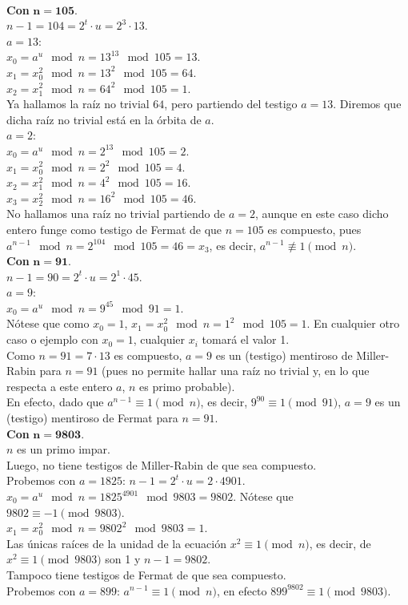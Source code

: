 \begin{ejemplo} \, \\
\textbf{Con} $\boldsymbol{n=105}$. \\
$n-1 = 104 = 2^t \cdot u = 2^3 \cdot 13$. \\
$a=13$: \\
$x_0 = a^{u} \mod n =13^{13} \mod 105 = 13$. \\
$x_1 = x_0^2 \mod n = 13^2 \mod 105 = 64$. \\
$x_2 = x_1^2 \mod n = 64^2 \mod 105 = 1$. \\
Ya hallamos la raíz no trivial $64$, pero partiendo del testigo $a=13$. Diremos que dicha raíz no trivial está en la órbita de $a$. \\
$a=2$: \\
$x_0 = a^{u} \mod n =2^{13} \mod 105 = 2$. \\
$x_1 = x_0^2 \mod n = 2^2 \mod 105 = 4$. \\
$x_2 = x_1^2 \mod n = 4^2 \mod 105 = 16$. \\
$x_3 = x_2^2 \mod n = 16^2 \mod 105 = 46$. \\
No hallamos una raíz no trivial partiendo de $a=2$, aunque en este caso dicho entero funge como testigo de Fermat de que $n=105$ es compuesto, pues $a^{n-1} \mod n = 2^{104} \mod 105 = 46 = x_3$, es decir, $a^{n-1} \not\equiv 1 \pmod n$. \\
\textbf{Con} $\boldsymbol{n=91}$. \\
$n-1 = 90 = 2^t \cdot u = 2^1 \cdot 45$. \\
$a=9$: \\
$x_0 = a^{u} \mod n =9^{45} \mod 91 = 1$. \\
Nótese que como $x_0=1$, $x_1 = x_0^2 \mod n = 1^2 \mod 105 = 1$. En cualquier otro caso o ejemplo con $x_0=1$, cualquier $x_i$ tomará el valor 1. \\
Como $n=91=7 \cdot 13$ es compuesto, $a=9$ es un (testigo) mentiroso de Miller-Rabin para $n=91$ (pues no permite hallar una raíz no trivial y, en lo que respecta a este entero $a$, $n$ es primo probable). \\
En efecto, dado que $a^{n-1} \equiv 1 \pmod n$, es decir, $9^{90} \equiv 1 \pmod {91}$, $a=9$ es un (testigo) mentiroso de Fermat para $n=91$.\\
\textbf{Con} $\boldsymbol{n=9803}$. \\
$n$ es un primo impar. \\
Luego, no tiene testigos de Miller-Rabin de que sea compuesto. \\ 
Probemos con $a=1825$:
$n-1 = 2^t \cdot u =2 \cdot 4901$. \\
$x_0 = a^{u} \mod n = 1825^{4901} \mod 9803 = 9802$. Nótese que $9802 \equiv -1 \pmod {9803}$. \\
$x_1 = x_0^2 \mod n = 9802^2 \mod 9803 = 1$. \\
Las únicas raíces de la unidad de la ecuación $x^2 \equiv 1 \pmod n$, es decir, de $x^2 \equiv 1 \pmod {9803}$ son 1 y $n-1=9802$. \\
Tampoco tiene testigos de Fermat de que sea compuesto. \\
Probemos con $a=899$: $a^{n-1} \equiv 1 \pmod n$, en efecto $899^{9802} \equiv 1 \pmod {9803}$.
\end{ejemplo}

